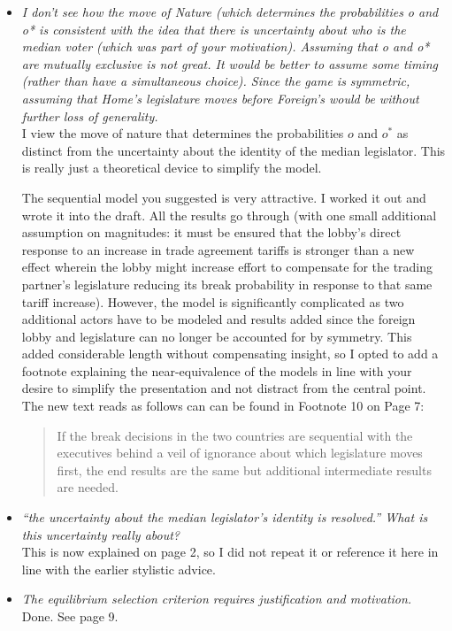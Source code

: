 \documentclass[12pt]{report}
\begin{document}
\begin{itemize}
  \item \textit{I don't see how the move of Nature (which determines the probabilities o and o* is consistent with the idea that there is uncertainty about who is the median voter (which was part of your motivation). Assuming that o and o* are mutually exclusive is not great. It would be better to assume some timing (rather than have a simultaneous choice). Since the game is symmetric, assuming that Home’s legislature moves before Foreign's would be without further loss of generality.} \\
	I view the move of nature that determines the probabilities $o$ and $o^*$ as distinct from the uncertainty about the identity of the median legislator. This is really just a theoretical device to simplify the model.
	
	The sequential model you suggested is very attractive. I worked it out and wrote it into the draft. All the results go through (with one small additional assumption on magnitudes: it must be ensured that the lobby's direct response to an increase in trade agreement tariffs is stronger than a new effect wherein the lobby might increase effort to compensate for the trading partner's legislature reducing its break probability in response to that same tariff increase). However, the model is significantly complicated as two additional actors have to be modeled and results added since the foreign lobby and legislature can no longer be accounted for by symmetry. This added considerable length without compensating insight, so I opted to add a footnote explaining the near-equivalence of the models in line with your desire to simplify the presentation and not distract from the central point. The new text reads as follows can can be found in Footnote 10 on Page 7:
	\begin{quote}
		If the break decisions in the two countries are sequential with the executives behind a veil of ignorance about which legislature moves first, the end results are the same but additional intermediate results are needed.
	\end{quote}
	
  \item \textit{``the uncertainty about the median legislator's identity is resolved.'' What is this uncertainty really about?} \\
	This is now explained on page 2, so I did not repeat it or reference it here in line with the earlier stylistic advice.
	
  \item \textit{The equilibrium selection criterion requires justification and motivation.} \\
	Done. See page 9.
	

\end{itemize}
\end{document}
